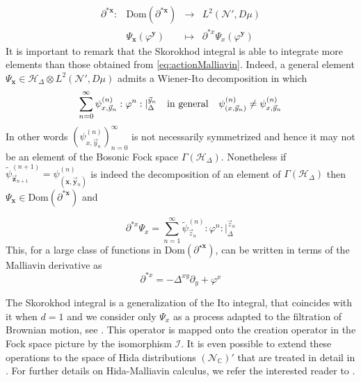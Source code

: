 \documentclass[12pt]{article}%
\begin{document}
\begin{equation}
    \label{eq:SkorokhodIntegral}
    \begin{array}{cccc}
        \partial^{*\mathbf{x}}:& \textrm{Dom}(\partial^{*\mathbf{x}}) &\longrightarrow &L^2(\mathcal{N}',D\mu)\\
         & \Psi_{\mathbf{x}}(\varphi^{\mathbf{y}}) & \longmapsto & \partial^{*{x}} \Psi_{x}(\varphi^{\mathbf{y}})
    \end{array}
\end{equation}
It is important to remark that the Skorokhod integral is able to integrate more elements than those obtained from \eqref{eq:actionMalliavin}. Indeed, a general element $\Psi_{\mathbf{x}}\in\mathcal{H}_\Delta\otimes L^2(\mathcal{N}',D\mu)$ admits a Wiener-Ito decomposition in which 
\begin{equation}
\label{eq:parametricWienerIto}
\sum_{n=0}^\infty\psi^{(n)}_{x,\vec{y}_n}:\varphi^n:\lvert_\Delta^{\vec{y}_n}\hspace{0.25 cm} \textrm{ in general } \hspace{0.25 cm}  \psi^{(n)}_{(x,\vec{y}_n)}\neq \psi^{(n)}_{x,\vec{y}_n}
\end{equation}
In other words $(\psi^{(n)}_{x,\vec{y}_n})_{n=0}^\infty$ is not necessarily symmetrized and hence it may not be an  element of the Bosonic Fock space $\Gamma(\mathcal{H}_\Delta)$. Nonetheless if  
$\tilde{\psi}^{(n+1)}_{\vec{\mathbf{z}}_{n+1}}=\psi^{(n)}_{(\mathbf{x},\vec{\mathbf{y}}_n)}$ is indeed the decomposition of an element of $\Gamma(\mathcal{H}_\Delta)$ then $\Psi_{\mathbf{x}}\in  \textrm{Dom}(\partial^{*\mathbf{x}})$ and 

\begin{equation}
\label{eq:actionSkorokhod}
\partial^{*{x}}\Psi_{{x}}=\sum_{n=1}^{\infty} \tilde{\psi}^{(n)}_{\vec{z}_n}:\varphi^n:\lvert_\Delta^{\vec{z}_n}
\end{equation}
This, for a large class of functions in $\textrm{Dom}(\partial^{\star\mathbf{x}})$, can be written in terms of the Malliavin derivative as 
\begin{equation}
\label{eq:creationOperator}
\partial^{*{x}}=-\Delta^{xy}\partial_y+\varphi^x
\end{equation}

The Skorokhod integral is a generalization of the Ito integral, that coincides with it when $d=1$ and we consider only $\Psi_x$ as a process adapted to the filtration of Brownian motion, see \cite{Nunno2009}.  This operator is mapped onto the creation operator in the Fock space picture by the isomorphism $\mathcal{I}$. 
It is even possible to extend these operations to the space of Hida distributions  $(\mathcal{N}_\mathbb{C})'$ that are treated in detail in \cite{alonso2023a}. For further details on Hida-Malliavin calculus,  we refer the interested reader to  \cite{Nunno2009}.
\end{document}

